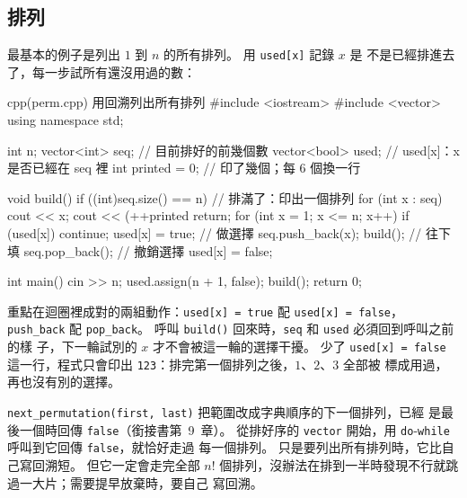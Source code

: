 \subsection{排列}

最基本的例子是列出 $1$ 到 $n$ 的所有排列。 用 \texttt{used[x]} 記錄 $x$ 是
不是已經排進去了，每一步試所有還沒用過的數：

\begin{example}[label=ex:perm]{cpp}{(perm.cpp) 用回溯列出所有排列}
#include <iostream>
#include <vector>
using namespace std;

int n;
vector<int> seq;           // 目前排好的前幾個數
vector<bool> used;         // used[x]：x 是否已經在 seq 裡
int printed = 0;           // 印了幾個；每 6 個換一行

void build() {
    if ((int)seq.size() == n) {          // 排滿了：印出一個排列
        for (int x : seq) {
            cout << x;
        }
        cout << (++printed %
        return;
    }
    for (int x = 1; x <= n; x++) {
        if (used[x]) {
            continue;
        }
        used[x] = true;                  // 做選擇
        seq.push_back(x);
        build();                         // 往下填
        seq.pop_back();                  // 撤銷選擇
        used[x] = false;
    }
}

int main() {
    cin >> n;
    used.assign(n + 1, false);
    build();
    return 0;
}
\end{example}


重點在迴圈裡成對的兩組動作：\texttt{used[x] = true} 配
\texttt{used[x] = false}，\texttt{push\_back} 配 \texttt{pop\_back}。 呼叫
\texttt{build()} 回來時，\texttt{seq} 和 \texttt{used} 必須回到呼叫之前的樣
子，下一輪試別的 $x$ 才不會被這一輪的選擇干擾。 少了 \texttt{used[x] = false}
這一行，程式只會印出 \texttt{123}：排完第一個排列之後，$1$、$2$、$3$ 全部被
標成用過，再也沒有別的選擇。

\begin{bridgerecap}
\texttt{next\_permutation(first, last)} 把範圍改成字典順序的下一個排列，已經
是最後一個時回傳 \texttt{false}（銜接書第~9~章）。 從排好序的 \texttt{vector}
開始，用 \texttt{do}-\texttt{while} 呼叫到它回傳 \texttt{false}，就恰好走過
每一個排列。 只是要列出所有排列時，它比自己寫回溯短。 但它一定會走完全部
$n!$ 個排列，沒辦法在排到一半時發現不行就跳過一大片；需要提早放棄時，要自己
寫回溯。
\end{bridgerecap}


